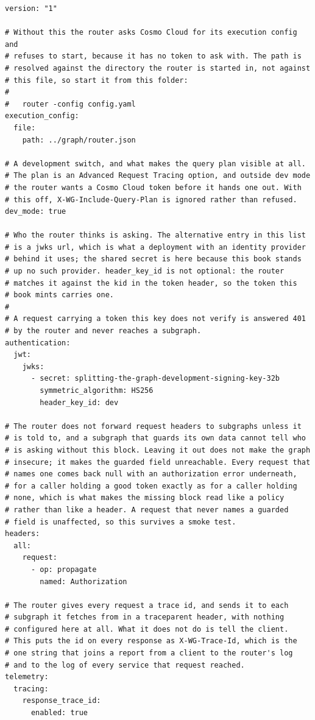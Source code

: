 \begin{verbatim}
version: "1"

# Without this the router asks Cosmo Cloud for its execution config and
# refuses to start, because it has no token to ask with. The path is
# resolved against the directory the router is started in, not against
# this file, so start it from this folder:
#
#   router -config config.yaml
execution_config:
  file:
    path: ../graph/router.json

# A development switch, and what makes the query plan visible at all.
# The plan is an Advanced Request Tracing option, and outside dev mode
# the router wants a Cosmo Cloud token before it hands one out. With
# this off, X-WG-Include-Query-Plan is ignored rather than refused.
dev_mode: true

# Who the router thinks is asking. The alternative entry in this list
# is a jwks url, which is what a deployment with an identity provider
# behind it uses; the shared secret is here because this book stands
# up no such provider. header_key_id is not optional: the router
# matches it against the kid in the token header, so the token this
# book mints carries one.
#
# A request carrying a token this key does not verify is answered 401
# by the router and never reaches a subgraph.
authentication:
  jwt:
    jwks:
      - secret: splitting-the-graph-development-signing-key-32b
        symmetric_algorithm: HS256
        header_key_id: dev

# The router does not forward request headers to subgraphs unless it
# is told to, and a subgraph that guards its own data cannot tell who
# is asking without this block. Leaving it out does not make the graph
# insecure; it makes the guarded field unreachable. Every request that
# names one comes back null with an authorization error underneath,
# for a caller holding a good token exactly as for a caller holding
# none, which is what makes the missing block read like a policy
# rather than like a header. A request that never names a guarded
# field is unaffected, so this survives a smoke test.
headers:
  all:
    request:
      - op: propagate
        named: Authorization

# The router gives every request a trace id, and sends it to each
# subgraph it fetches from in a traceparent header, with nothing
# configured here at all. What it does not do is tell the client.
# This puts the id on every response as X-WG-Trace-Id, which is the
# one string that joins a report from a client to the router's log
# and to the log of every service that request reached.
telemetry:
  tracing:
    response_trace_id:
      enabled: true
\end{verbatim}

